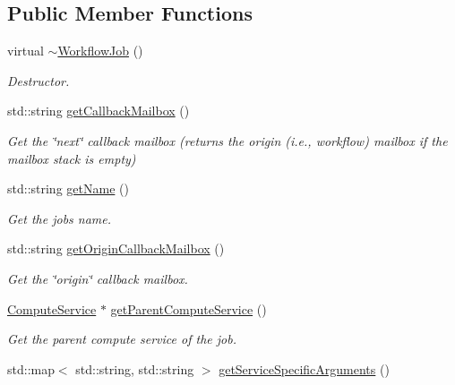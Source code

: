 \subsection*{Public Member Functions}
\begin{DoxyCompactItemize}
\item 
\mbox{\label{classwrench_1_1_workflow_job_ae57fb8239da5c07797c16b5de0c27bb9}} 
virtual \hyperlink{classwrench_1_1_workflow_job_ae57fb8239da5c07797c16b5de0c27bb9}{$\sim$\+Workflow\+Job} ()
\begin{DoxyCompactList}\small\item\em Destructor. \end{DoxyCompactList}\item 
std\+::string \hyperlink{classwrench_1_1_workflow_job_a45c0b59f3792d3d6de90efedbff064bc}{get\+Callback\+Mailbox} ()
\begin{DoxyCompactList}\small\item\em Get the \char`\"{}next\char`\"{} callback mailbox (returns the origin (i.\+e., workflow) mailbox if the mailbox stack is empty) \end{DoxyCompactList}\item 
std\+::string \hyperlink{classwrench_1_1_workflow_job_a567b35eaf3952997a71eeedd97138794}{get\+Name} ()
\begin{DoxyCompactList}\small\item\em Get the job\textquotesingle{}s name. \end{DoxyCompactList}\item 
std\+::string \hyperlink{classwrench_1_1_workflow_job_aa33e4d7acda1bceb454506a29e2202ea}{get\+Origin\+Callback\+Mailbox} ()
\begin{DoxyCompactList}\small\item\em Get the \char`\"{}origin\char`\"{} callback mailbox. \end{DoxyCompactList}\item 
\hyperlink{classwrench_1_1_compute_service}{Compute\+Service} $\ast$ \hyperlink{classwrench_1_1_workflow_job_a208cda11fce6d8aaf2bf861fbe81994b}{get\+Parent\+Compute\+Service} ()
\begin{DoxyCompactList}\small\item\em Get the parent compute service of the job. \end{DoxyCompactList}\item 
std\+::map$<$ std\+::string, std\+::string $>$ \hyperlink{classwrench_1_1_workflow_job_a7e5ce22d0b057d90fc18dd0cbbfaa692}{get\+Service\+Specific\+Arguments} ()

\end{DoxyCompactItemize}
